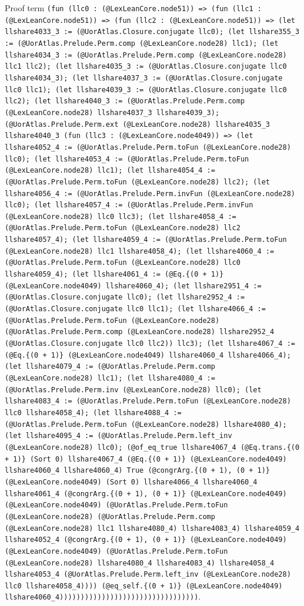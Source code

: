 \documentclass[11pt]{article}
\begin{document}
\noindent Proof term \texttt{(fun (llc0 : (@LexLeanCore.node51)) => (fun (llc1 : (@LexLeanCore.node51)) => (fun (llc2 : (@LexLeanCore.node51)) => (let llshare4033\_3 := (@UorAtlas.Closure.conjugate llc0); (let llshare355\_3 := (@UorAtlas.Prelude.Perm.comp (@LexLeanCore.node28) llc1); (let llshare4034\_3 := (@UorAtlas.Prelude.Perm.comp (@LexLeanCore.node28) llc1 llc2); (let llshare4035\_3 := (@UorAtlas.Closure.conjugate llc0 llshare4034\_3); (let llshare4037\_3 := (@UorAtlas.Closure.conjugate llc0 llc1); (let llshare4039\_3 := (@UorAtlas.Closure.conjugate llc0 llc2); (let llshare4040\_3 := (@UorAtlas.Prelude.Perm.comp (@LexLeanCore.node28) llshare4037\_3 llshare4039\_3); (@UorAtlas.Prelude.Perm.ext (@LexLeanCore.node28) llshare4035\_3 llshare4040\_3 (fun (llc3 : (@LexLeanCore.node4049)) => (let llshare4052\_4 := (@UorAtlas.Prelude.Perm.toFun (@LexLeanCore.node28) llc0); (let llshare4053\_4 := (@UorAtlas.Prelude.Perm.toFun (@LexLeanCore.node28) llc1); (let llshare4054\_4 := (@UorAtlas.Prelude.Perm.toFun (@LexLeanCore.node28) llc2); (let llshare4056\_4 := (@UorAtlas.Prelude.Perm.invFun (@LexLeanCore.node28) llc0); (let llshare4057\_4 := (@UorAtlas.Prelude.Perm.invFun (@LexLeanCore.node28) llc0 llc3); (let llshare4058\_4 := (@UorAtlas.Prelude.Perm.toFun (@LexLeanCore.node28) llc2 llshare4057\_4); (let llshare4059\_4 := (@UorAtlas.Prelude.Perm.toFun (@LexLeanCore.node28) llc1 llshare4058\_4); (let llshare4060\_4 := (@UorAtlas.Prelude.Perm.toFun (@LexLeanCore.node28) llc0 llshare4059\_4); (let llshare4061\_4 := (@Eq.\{(0 + 1)\} (@LexLeanCore.node4049) llshare4060\_4); (let llshare2951\_4 := (@UorAtlas.Closure.conjugate llc0); (let llshare2952\_4 := (@UorAtlas.Closure.conjugate llc0 llc1); (let llshare4066\_4 := (@UorAtlas.Prelude.Perm.toFun (@LexLeanCore.node28) (@UorAtlas.Prelude.Perm.comp (@LexLeanCore.node28) llshare2952\_4 (@UorAtlas.Closure.conjugate llc0 llc2)) llc3); (let llshare4067\_4 := (@Eq.\{(0 + 1)\} (@LexLeanCore.node4049) llshare4060\_4 llshare4066\_4); (let llshare4079\_4 := (@UorAtlas.Prelude.Perm.comp (@LexLeanCore.node28) llc1); (let llshare4080\_4 := (@UorAtlas.Prelude.Perm.inv (@LexLeanCore.node28) llc0); (let llshare4083\_4 := (@UorAtlas.Prelude.Perm.toFun (@LexLeanCore.node28) llc0 llshare4058\_4); (let llshare4088\_4 := (@UorAtlas.Prelude.Perm.toFun (@LexLeanCore.node28) llshare4080\_4); (let llshare4095\_4 := (@UorAtlas.Prelude.Perm.left\_inv (@LexLeanCore.node28) llc0); (@of\_eq\_true llshare4067\_4 (@Eq.trans.\{(0 + 1)\} (Sort 0) llshare4067\_4 (@Eq.\{(0 + 1)\} (@LexLeanCore.node4049) llshare4060\_4 llshare4060\_4) True (@congrArg.\{(0 + 1), (0 + 1)\} (@LexLeanCore.node4049) (Sort 0) llshare4066\_4 llshare4060\_4 llshare4061\_4 (@congrArg.\{(0 + 1), (0 + 1)\} (@LexLeanCore.node4049) (@LexLeanCore.node4049) (@UorAtlas.Prelude.Perm.toFun (@LexLeanCore.node28) (@UorAtlas.Prelude.Perm.comp (@LexLeanCore.node28) llc1 llshare4080\_4) llshare4083\_4) llshare4059\_4 llshare4052\_4 (@congrArg.\{(0 + 1), (0 + 1)\} (@LexLeanCore.node4049) (@LexLeanCore.node4049) (@UorAtlas.Prelude.Perm.toFun (@LexLeanCore.node28) llshare4080\_4 llshare4083\_4) llshare4058\_4 llshare4053\_4 (@UorAtlas.Prelude.Perm.left\_inv (@LexLeanCore.node28) llc0 llshare4058\_4)))) (@eq\_self.\{(0 + 1)\} (@LexLeanCore.node4049) llshare4060\_4)))))))))))))))))))))))))))))))))}.\par
\end{document}
